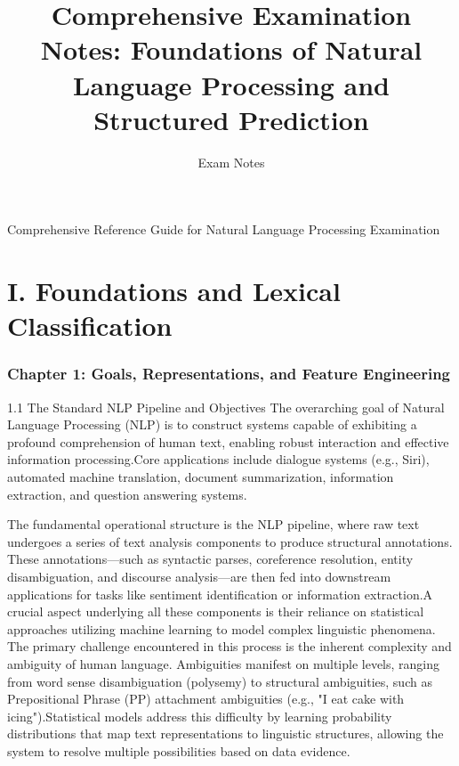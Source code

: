 \documentclass{article}
\title{Comprehensive Examination Notes: Foundations of Natural Language Processing and Structured Prediction}
\author{Exam Notes}
\date{}
\begin{document}
\maketitle

\tableofcontents

\clearpage

Comprehensive Reference Guide for Natural Language Processing Examination
\setcounter{footnote}{0} 

\part{I. Foundations and Lexical Classification}
\section{Chapter 1: Goals, Representations, and Feature Engineering}
1.1 The Standard NLP Pipeline and Objectives
The overarching goal of Natural Language Processing (NLP) is to construct systems capable of exhibiting a profound comprehension of human text, enabling robust interaction and effective information processing.\footnotemark[1] Core applications include dialogue systems (e.g., Siri), automated machine translation, document summarization, information extraction, and question answering systems.\footnotemark[1]

The fundamental operational structure is the NLP pipeline, where raw text undergoes a series of text analysis components to produce structural annotations. These annotations—such as syntactic parses, coreference resolution, entity disambiguation, and discourse analysis—are then fed into downstream applications for tasks like sentiment identification or information extraction.\footnotemark[1] A crucial aspect underlying all these components is their reliance on statistical approaches utilizing machine learning to model complex linguistic phenomena.
The primary challenge encountered in this process is the inherent complexity and ambiguity of human language. Ambiguities manifest on multiple levels, ranging from word sense disambiguation (polysemy) to structural ambiguities, such as Prepositional Phrase (PP) attachment ambiguities (e.g., "I eat cake with icing").\footnotemark[1] Statistical models address this difficulty by learning probability distributions that map text representations to linguistic structures, allowing the system to resolve multiple possibilities based on data evidence.\footnotemark[1]
\end{document}
